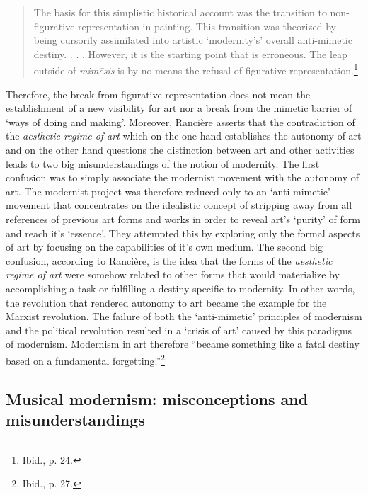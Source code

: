 \begin{quote}
The basis for this simplistic historical account was the transition to non-figurative representation in painting. This transition was theorized by being cursorily assimilated into artistic `modernity's' overall anti-mimetic destiny. . . . However, it is the starting point that is erroneous. The leap outside of \emph{mim\={e}sis} is by no means the refusal of figurative representation.\footnote{Ibid., p. 24.}
\end{quote}

Therefore, the break from figurative representation does not mean the establishment of a new visibility for art nor a break from the mimetic barrier of `ways of doing and making'. Moreover, Ranci\`{e}re asserts that the contradiction of the \emph{aesthetic regime of art} which on the one hand establishes the autonomy of art and on the other hand questions the distinction between art and other activities leads to two big misunderstandings of the notion of modernity. The first confusion was to simply associate the modernist movement with the autonomy of art. The modernist project was therefore reduced only to an `anti-mimetic' movement that concentrates on the idealistic concept of stripping away from all references of previous art forms and works in order to reveal art's `purity' of form and reach it's `essence'. They attempted this by exploring only the formal aspects of art by focusing on the capabilities of it's own medium. The second big confusion, according to Ranci\`{e}re, is the idea that the forms of the \emph{aesthetic regime of art} were somehow related to other forms that would materialize by accomplishing a task or fulfilling a destiny specific to modernity. In other words, the revolution that rendered autonomy to art became the example for the Marxist revolution. The failure of both the `anti-mimetic' principles of modernism and the political revolution resulted in a `crisis of art' caused by this paradigms of modernism. Modernism in art therefore ``became something like a fatal destiny based on a fundamental forgetting.''\footnote{Ibid., p. 27.} 

\subsection{Musical modernism: misconceptions and misunderstandings}

